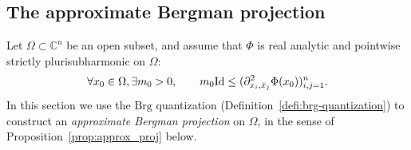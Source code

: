 \documentclass{article}
\newcommand{\Brg}{\mathrm{Brg}}
\newcommand{\CM}{\mathbb{C}}
\begin{document}
\subsection{The approximate Bergman projection}

Let $\Omega\subset\CM^n$ be an open subset, and assume that $\Phi$ is
real analytic and pointwise strictly plurisubharmonic on $\Omega$:
\begin{equation}
  \forall x_0\in\Omega, \exists m_0>0, \qquad 
  m_0\textup{Id} \leq ( \partial^2_{x_i,
    \bar{x}_j} \Phi(x_0) )_{i, j=1}^n.
\end{equation}
In this section we use the $\Brg$ quantization
(Definition~\ref{defi:brg-quantization}) to construct an
\emph{approximate Bergman projection} on $\Omega$, in the sense of
Proposition~\ref{prop:approx_proj} below.
\end{document}
